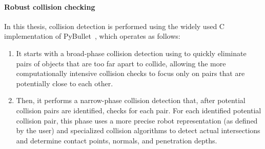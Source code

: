 \paragraph{Robust collision checking}
In this thesis, collision detection is performed using the widely used C implementation of PyBullet~\cite{cBullet}, which operates as follows: 
\begin{enumerate}
    \item It starts with a broad-phase collision detection using  to quickly eliminate pairs of objects that are too far apart to collide, allowing the more computationally intensive collision checks to focus only on pairs that are potentially close to each other.
    \item Then, it performs a narrow-phase collision detection that, after potential collision pairs are identified, checks for each pair. 
    For each identified potential collision pair, this phase uses a more precise robot representation (as defined by the user) and specialized collision algorithms to detect actual intersections and determine contact points, normals, and penetration depths.
\end{enumerate}

